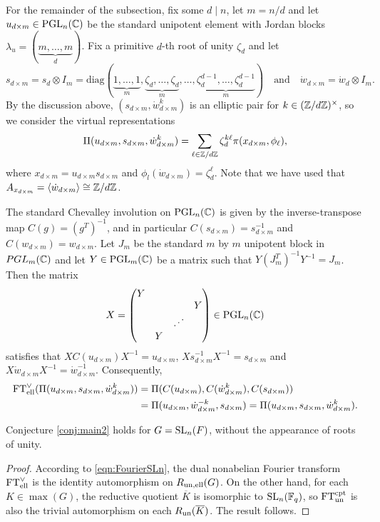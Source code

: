 For the remainder of the subsection, fix some $d\mid n$, let $m=n/d$ and let $u_{d\times m}\in\mathrm{PGL}_n(\mathbb{C})$ be the standard unipotent element with Jordan blocks $\lambda_u=(\underbrace{m,\ldots,m}_{d})$. Fix a primitive $d$-th root of unity $\zeta_d$ and let 
$$s_{d\times m}=s_d\otimes I_m=\textrm{diag}(\underbrace{1,\ldots,1}_{m},\underbrace{\zeta_d,\ldots,\zeta_d}_{m},\ldots,\underbrace{\zeta_d^{d-1},\ldots,\zeta_d^{d-1}}_{m})\quad\text{and}\quad \dot{w}_{d\times m}=\dot{w}_d\otimes I_m.$$
By the discussion above, $(s_{d\times m},\dot{w}_{d\times m}^k)$ is an elliptic pair for $k\in(\mathbb{Z}/d\mathbb{Z})^\times$, so we consider the virtual representations 
$$\Pi(u_{d\times m},s_{d\times m},\dot{w}^k_{d\times m})=\sum_{\ell\in\mathbb{Z}/d\mathbb{Z}}\zeta_d^{k\ell}\pi(x_{d\times m},\phi_\ell),$$
where $x_{d\times m}=u_{d\times m}s_{d\times m}$ and $\phi_l(\dot{w}_{d\times m})=\zeta^\ell_d$. Note that we have used that $A_{x_{d\times m}}=\langle\dot{w}_{d\times m}\rangle\cong\mathbb{Z}/d\mathbb{Z}$.

The standard Chevalley involution on $\mathrm{PGL}_n(\mathbb{C})$ is given by the inverse-transpose map $C(g)=(g^T)^{-1}$, and in particular $C(s_{d\times m})=s_{d\times m}^{-1}$ and $C(w_{d\times m})=w_{d\times m}$. Let $J_m$ be the standard $m$ by $m$ unipotent block in $PGL_m(\mathbb{C})$ and let $Y\in\mathrm{PGL}_m(\mathbb{C})$ be a matrix such that $Y(J_m^T)^{-1}Y^{-1}=J_m$. Then the matrix 
\begin{equation*}
    X=\begin{pmatrix}
        Y & & & \\
        & & & Y \\
        & & \iddots & \\
        & Y & & 
    \end{pmatrix}\in\mathrm{PGL}_n(\mathbb{C})
\end{equation*}
satisfies that $XC(u_{d\times m})X^{-1}=u_{d\times m}$, $Xs_{d\times m}^{-1}X^{-1}=s_{d\times m}$ and $X\dot{w}_{d\times m}X^{-1}=\dot{w}_{d\times m}^{-1}$. Consequently,
\begin{align}\label{eqn:FourierSLn}
    \notag \mathrm{FT}^\vee_{\mathrm{ell}}(\Pi(u_{d\times m}, s_{d\times m},\dot{w}_{d\times m}^{k}))&=\Pi(C(u_{d\times m}), C(\dot{w}_{d\times m}^k), C(s_{d\times m}))\\
    &=\Pi(u_{d\times m}, \dot{w}_{d\times m}^{-k},s_{d\times m})=\Pi(u_{d\times m}, s_{d\times m},\dot{w}_{d\times m}^{k}).
\end{align}

\begin{proposition}
    Conjecture \ref{conj:main2} holds for $G=\mathrm{SL}_n(F)$, without the appearance of roots of unity.
\end{proposition}
\begin{proof}
    According to \eqref{eqn:FourierSLn}, the dual nonabelian Fourier transform $\mathrm{FT}^\vee_{\mathrm{ell}}$ is the identity automorphism on $R_{\mathrm{un},\mathrm{ell}}(G)$. On the other hand, for each $K\in\max(G)$, the reductive quotient $\overline{K}$ is isomorphic to $\mathrm{SL}_n(\mathbb{F}_q)$, so $\mathrm{FT}^{\mathrm{cpt}}_{\mathrm{un}}$ is also the trivial automorphism on each $R_{\mathrm{un}}(\overline{K})$. The result follows.
\end{proof}